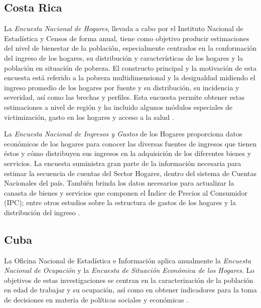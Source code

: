 \documentclass[12pt,spanish,]{book}
\begin{document}
\hypertarget{costa-rica}{%
\subsection*{Costa Rica}\label{costa-rica}}

La \emph{Encuesta Nacional de Hogares}, llevada a cabo por el Instituto Nacional de Estadística y Censos de forma anual, tiene como objetivo producir estimaciones del nivel de bienestar de la población, especialmente centrados en la conformación del ingreso de los hogares, su distribución y características de los hogares y la población en situación de pobreza. El constructo principal y la motivación de esta encuesta está referido a la pobreza multidimensional y la desigualdad midiendo el ingreso promedio de los hogares por fuente y su distribución, su incidencia y severidad, así como las brechas y perfiles. Esta encuesta permite obtener estas estimaciones a nivel de región y ha incluido algunos módulos especiales de victimización, gasto en los hogares y acceso a la salud \autocite{INEC-CR_2017}.

La \emph{Encuesta Nacional de Ingresos y Gastos} de los Hogares proporciona datos económicos de los hogares para conocer las diversas fuentes de ingresos que tienen éstos y cómo distribuyen sus ingresos en la adquisición de los diferentes bienes y servicios. La encuesta suministra gran parte de la información necesaria para estimar la secuencia de cuentas del Sector Hogares, dentro del sistema de Cuentas Nacionales del país. También brinda los datos necesarios para actualizar la canasta de bienes y servicios que componen el Índice de Precios al Consumidor (IPC); entre otros estudios sobre la estructura de gastos de los hogares y la distribución del ingreso \autocite{INEC-CR_2018}.

\hypertarget{cuba}{%
\subsection*{Cuba}\label{cuba}}

La Oficina Nacional de Estadística e Información aplica anualmente la \emph{Encuesta Nacional de Ocupación} y la \emph{Encuesta de Situación Económica de los Hogares}. Lo objetivos de estas investigaciones se centran en la caracterización de la población en edad de trabajar y su ocupación, así como en obtener indicadores para la toma de decisiones en materia de políticas sociales y económicas \autocite{ONE-CU}.
\end{document}

